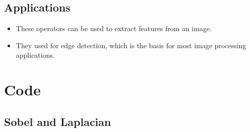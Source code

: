 \documentclass[]{article}
\providecommand{\tightlist}{%
  \setlength{\itemsep}{0pt}\setlength{\parskip}{0pt}}
\begin{document}
\subsection{Applications}\label{applications}

\begin{itemize}
\tightlist
\item
  These operators can be used to extract features from an image.
\item
  They used for edge detection, which is the basis for most image
  processing applications.
\end{itemize}

\section{Code}\label{code}

\subsection{Sobel and Laplacian}\label{sobel-and-laplacian}
\end{document}
